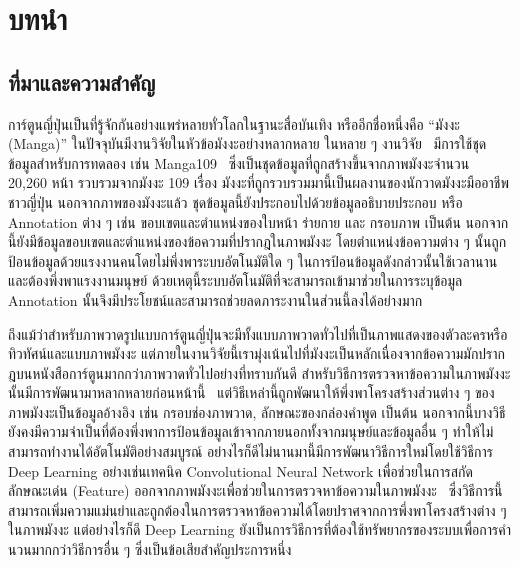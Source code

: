\chapter{บทนำ}
\label{chapter:introduction}

\section{ที่มาและความสำคัญ}

การ์ตูนญี่ปุ่นเป็นที่รู้จักกันอย่างแพร่หลายทั่วโลกในฐานะสื่อบันเทิง หรืออีกชื่อหนึ่งคือ “มังงะ (Manga)” ในปัจจุบันมีงานวิจัยในหัวข้อมังงะอย่างหลากหลาย ในหลาย ๆ งานวิจัย~\cite{8369633, Liu2016, Pang2014, 7415523, ogawa2018, 7351614, 7452668} มีการใช้ชุดข้อมูลสำหรับการทดลอง เช่น Manga109~\cite{Matsui2017} ซึ่งเป็นชุดข้อมูลที่ถูกสร้างขึ้นจากภาพมังงะจำนวน 20,260 หน้า รวบรวมจากมังงะ 109 เรื่อง มังงะที่ถูกรวบรวมมานี้เป็นผลงานของนักวาดมังงะมืออาชีพชาวญี่ปุ่น นอกจากภาพของมังงะแล้ว ชุดข้อมูลนี้ยังประกอบไปด้วยข้อมูลอธิบายประกอบ หรือ Annotation ต่าง ๆ เช่น ขอบเขตและตำแหน่งของใบหน้า ร่ายกาย และ กรอบภาพ เป็นต้น นอกจากนี้ยังมีข้อมูลขอบเขตและตำแหน่งของข้อความที่ปรากฎในภาพมังงะ โดยตำแหน่งข้อความต่าง ๆ นั้นถูกป้อนข้อมูลด้วยแรงงานคนโดยไม่พึ่งพาระบบอัตโนมัติใด ๆ ในการป้อนข้อมูลดังกล่าวนั้นใช้เวลานานและต้องพึ่งพาแรงงานมนุษย์ ด้วยเหตุนี้ระบบอัตโนมัติที่จะสามารถเข้ามาช่วยในการระบุข้อมูล Annotation นั้นจึงมีประโยชน์และสามารถช่วยลดภาระงานในส่วนนี้ลงได้อย่างมาก

ถึงแม้ว่าสำหรับภาพวาดรูปแบบการ์ตูนญี่ปุ่นจะมีทั้งแบบภาพวาดทั่วไปที่เป็นภาพแสดงของตัวละครหรือทิวทัศน์และแบบภาพมังงะ แต่ภายในงานวิจัยนี้เรามุ่งเน้นไปที่มังงะเป็นหลักเนื่องจากข้อความมักปรากฎบนหนังสือการ์ตูนมากกว่าภาพวาดทั่วไปอย่างที่ทราบกันดี สำหรับวิธีการตรวจหาข้อความในภาพมังงะนั้นมีการพัฒนามาหลากหลายก่อนหน้านี้~\cite{6761596, 7490104} แต่วิธีเหล่านี้ถูกพัฒนาให้พึ่งพาโครงสร้างส่วนต่าง ๆ ของภาพมังงะเป็นข้อมูลอ้างอิง เช่น กรอบช่องภาพวาด, ลักษณะของกล่องคำพูด เป็นต้น นอกจากนี้บางวิธียังคงมีความจำเป็นที่ต้องพึ่งพาการป้อนข้อมูลเข้าจากภายนอกทั้งจากมนุษย์และข้อมูลอื่น ๆ ทำให้ไม่สามารถทำงานได้อัตโนมัติอย่างสมบูรณ์ อย่างไรก็ดีไม่นานมานี้มีการพัฒนาวิธีการใหม่โดยใช้วิธีการ Deep Learning อย่างเช่นเทคนิค Convolutional Neural Network เพื่อช่วยในการสกัดลักษณะเด่น (Feature) ออกจากภาพมังงะเพื่อช่วยในการตรวจหาข้อความในภาพมังงะ~\cite{7532890} ซึ่งวิธีการนี้สามารถเพิ่มความแม่นยำและถูกต้องในการตรวจหาข้อความได้โดยปราศจากการพึ่งพาโครงสร้างต่าง ๆ ในภาพมังงะ แต่อย่างไรก็ดี Deep Learning ยังเป็นการวิธีการที่ต้องใช้ทรัพยากรของระบบเพื่อการคำนวนมากกว่าวิธีการอื่น ๆ ซึ่งเป็นข้อเสียสำคัญประการหนึ่ง~\cite{7532890}

